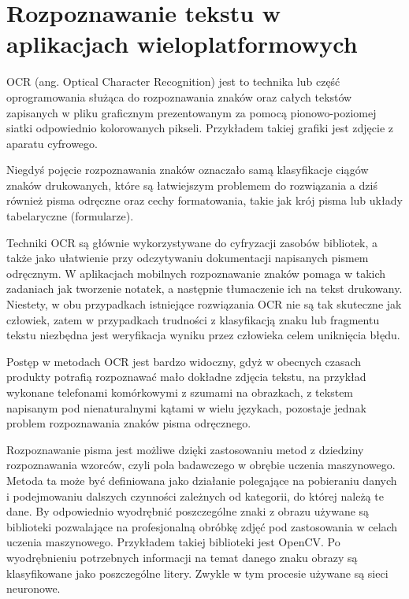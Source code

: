 \documentclass[brudnopis]{xmgr}
\begin{document}
\chapter{Rozpoznawanie tekstu w aplikacjach wieloplatformowych}

OCR\cite{20} (ang. Optical Character Recognition) jest to technika lub część oprogramowania służąca do rozpoznawania znaków oraz całych tekstów zapisanych w pliku graficznym prezentowanym za pomocą pionowo-poziomej siatki odpowiednio kolorowanych pikseli. Przykładem takiej grafiki jest zdjęcie z aparatu cyfrowego. 

Niegdyś pojęcie rozpoznawania znaków oznaczało samą klasyfikacje ciągów znaków drukowanych, które są łatwiejszym problemem do rozwiązania a dziś również pisma odręczne oraz cechy formatowania, takie jak krój pisma lub układy tabelaryczne (formularze).

Techniki OCR są głównie wykorzystywane do cyfryzacji zasobów bibliotek, a także jako ułatwienie przy odczytywaniu dokumentacji napisanych pismem odręcznym. W aplikacjach mobilnych rozpoznawanie znaków pomaga w takich zadaniach jak tworzenie notatek, a następnie tłumaczenie ich na tekst drukowany. Niestety, w obu przypadkach istniejące rozwiązania OCR nie są tak skuteczne jak człowiek, zatem w przypadkach trudności z klasyfikacją znaku lub fragmentu tekstu niezbędna jest weryfikacja wyniku przez człowieka celem uniknięcia błędu.

Postęp w metodach OCR jest bardzo widoczny, gdyż w obecnych czasach produkty potrafią rozpoznawać mało dokładne zdjęcia tekstu, na przykład wykonane telefonami komórkowymi z szumami na obrazkach, z tekstem napisanym pod nienaturalnymi kątami w wielu językach, pozostaje jednak problem rozpoznawania znaków pisma odręcznego.

Rozpoznawanie pisma jest możliwe dzięki zastosowaniu metod z dziedziny rozpoznawania wzorców, czyli pola badawczego w obrębie uczenia maszynowego. Metoda ta może być definiowana jako działanie polegające na pobieraniu danych i podejmowaniu dalszych czynności zależnych od kategorii, do której należą te dane. By odpowiednio wyodrębnić poszczególne znaki z obrazu używane są biblioteki pozwalające na profesjonalną obróbkę zdjęć pod zastosowania w celach uczenia maszynowego. Przykładem takiej biblioteki jest OpenCV\cite{21}. Po wyodrębnieniu potrzebnych informacji na temat danego znaku obrazy są klasyfikowane jako poszczególne litery. Zwykle w tym procesie używane są sieci neuronowe.
\end{document}
